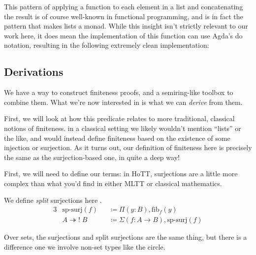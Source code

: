 \begin{agdalisting}
  This pattern of applying a function to each element in a list and
  concatenating the result is of course well-known in functional programming,
  and is in fact the pattern that makes lists a monad.
  While this insight isn't strictly relevant to our work here, it does mean
  the implementation of this function can use Agda's do notation, resulting
  in the following extremely clean implementation:
\end{agdalisting}

\subsection{Derivations}
We have a way to construct finiteness proofs, and a semiring-like toolbox to
combine them.
What we're now interested in is what we can \emph{derive} from them.

First, we will look at how this predicate relates to more traditional, classical
notions of finiteness.
in a classical setting we likely wouldn't mention ``lists'' or the like, and
would instead define finiteness based on the existence of some injection or
surjection.
As it turns out, our definition of finiteness here is precisely the same as the
surjection-based one, in quite a deep way!

First, we will need to define our terms: in HoTT, surjections are a little more
complex than what you'd find in either MLTT or classical mathematics.
\begin{definition} \label{split-surjections}
  We define \emph{split} surjections here \cite[definition
  4.6.1]{hottbook}.
  \begin{alignat}{3}
    &\text{sp-surj}(f)          &&\coloneqq \Pi(y : B) , \text{fib}_f(y) \label{sp-surj-eqn} \\
    &A \twoheadrightarrow! \; B &&\coloneqq \Sigma (f : A \rightarrow B) , \text{sp-surj}(f) \label{sp-surj-arrow-eqn}
  \end{alignat}
\end{definition}
Over sets, the surjections and split surjections are the same thing, but there
is a difference one we involve non-set types like the circle.

